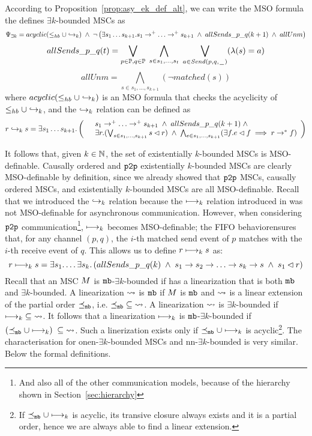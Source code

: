 \noindent According to Proposition~\ref{prop:asy_ek_def_alt}, we can write the MSO formula the defines $\exists k$-bounded MSCs as
\[
\Psi_{\exists k}=
acyclic(\happensbefore \cup \relbAsy) \;\wedge\;
\neg \left(
	\exists s_1 \dots s_{k+1}. s_1 \procrel^+ \dots \procrel^+ s_{k+1} \;\wedge \;
	allSends\_p\_q(k+1) \;\wedge\; allUnm
\right)
\]
\[
allSends\_p\_q (t) =
\bigvee_{\substack{p \in \mathbb{P}, q \in \mathbb{P}}}\;
\bigwedge_{s \in {s_1, ..., s_{t}}}\;
\bigvee_{a \in {\mathit{Send}(p,q,\hspace{0.1em}\underline{\hspace{0.5em}}\hspace{0.1em})}}
(\lambda(s) = a)
\]
\[
allUnm = \bigwedge_{s \in {s_1, ..., s_{k+1}}}(\neg \mathit{matched}(s))
\]
where $acyclic(\leq_{hb} \cup \hookrightarrow_{k})$ is an MSO formula that checks the acyclicity of $\leq_{hb} \cup \hookrightarrow_{k}$, and the $\hookrightarrow_{k}$ relation can be defined as
\[
r \relbAsy s= \exists s_1 \dots s_{k+1}. \left(
\begin{array}{rl}
	& s_1 \procrel^+ \dots \procrel^+ s_{k+1} \;\wedge\;
	allSends\_p\_q(k+1) \;\wedge\; \\
	& \exists r. (\bigvee_{s \in {s_1, ..., s_{k+1}}}s \lhd r) \;\wedge\;
	\bigwedge_{e \in {s_1, ..., s_{k+1}}}(\exists f.e \lhd f \implies r \procrel^* f) \\
\end{array}
\right)
\]

\medskip

It follows that, given $k \in \mathbb{N}$, the set of existentially $k$-bounded MSCs is MSO-definable. Causally ordered and $\mathtt{p2p}$ existentially $k$-bounded MSCs are clearly MSO-definable by definition, since we already showed that $\mathtt{p2p}$ MSCs, causally ordered MSCs, and existentially $k$-bounded MSCs are all MSO-definable. Recall that we introduced the $\hookrightarrow_{k}$ relation because the $\longmapsto_k$ relation introduced in \cite{DBLP:conf/fossacs/LohreyM02} was not MSO-definable for asynchronous communication. However, when considering $\mathtt{p2p}$ communication\footnote{And also all of the other communication models, because of the hierarchy shown in Section~\ref{sec:hierarchy}}, $\longmapsto_k$ becomes MSO-definable; the FIFO behaviorensures that, for any channel $(p,q)$, the $i$-th matched send event of $p$ matches with the $i$-th receive event of $q$. This allows us to define $r \longmapsto_k s$ as:
\[
r \relb s=\exists s_1. \dots \exists s_k.\left(
allSends\_p\_q(k)
\;\wedge\; s_1\procrel s_2\procrel\dots
\procrel s_k\procrel s
\;\wedge\; s_1 \lhd r
\right)
\]
Recall that an MSC $M$ is $\mathtt{mb}$-$\exists k$-bounded if has a linearization that is both $\mathtt{mb}$ and $\exists k$-bounded. A linearization $\rightsquigarrow$ is $\mathtt{mb}$ if $M$ is $\mathtt{mb}$ and $\rightsquigarrow$ is a linear extension of the partial order $\preceq_{\mathtt{mb}}$, i.e. $\preceq_{\mathtt{mb}} \;\subseteq\; \rightsquigarrow$. A linearization $\rightsquigarrow$ is $\exists k$-bounded if $\longmapsto_k \;\subseteq\; \rightsquigarrow$. It follows that a linearization $\longmapsto_k$ is $\mathtt{mb}$-$\exists k$-bounded if $(\preceq_{\mathtt{mb}} \cup \longmapsto_k) \;\subseteq\; \rightsquigarrow$. Such a linerization exists only if $\preceq_{\mathtt{mb}} \cup \longmapsto_k$ is acyclic\footnote{If $\preceq_{\mathtt{mb}} \cup \longmapsto_k$ is acyclic, its transive closure always exists and it is a partial order, hence we are always able to find a linear extension.}. The characterisation for onen-$\exists k$-bounded MSCs and nn-$\exists k$-bounded is very similar. Below the formal definitions.

